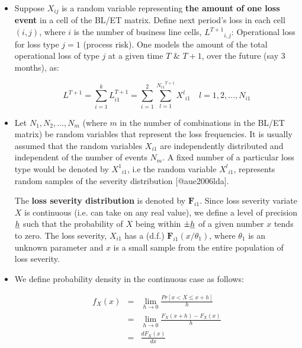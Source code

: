 \documentclass{DissertateUSU}
\begin{document}
\begin{itemize}
\item Suppose $X_{ij}$ is a random variable representing \textbf{the amount of one loss event} in a cell of the BL/ET matrix. Define next period's loss in each cell $(i,j)$, where $i$ is the number of business line cells, \begin{math} {{L}^{T+1}}_{i,j}\end{math}: Operational loss for loss type $j=1$ (process risk). One models the amount of the total operational loss of type $j$ at a given time $T$ \& $T + 1$, over the future (say 3 months), as:

\singlespacing
\begin{equation}\label{eqn5}
{L}^{T+1}=\sum_{i=1}^{k}{L}^{T+1}_{i1}=\sum_{i=1}^{2}\sum_{l=1}^{{{N}_{i1}}^{T+1}}{{X}^{l}}_{i1} \quad l=1,2,\ldots, N_{i1} 
\end{equation}
\doublespacing

\item Let $ N_1, N_2,...,N_m $ (where $m$ in the number of combinations in the BL/ET matrix) be random variables that represent the loss frequencies. It is usually assumed that the random variables $X_{i1}$ are independently distributed and independent of the number of events $N_{m}$. A fixed number of a particular loss type would be denoted by ${{X}^{1}}_{i1}$, i.e the random variable \begin{math}{{X}^{l}}_{i1}\end{math}, represents random samples of the severity distribution [@aue2006lda].\medskip

The \textbf{loss severity distribution} is denoted by \begin{math}\mathbf{F}_{i1}\end{math}. Since loss severity variate $X$ is continuous (i.e. can take on any real value), we define a level of precision $\emph{h}$ such that the probability of $X$ being within $\pm\emph{h}$ of a given number $x$ tends to zero. The loss severity, $X_{i1}$ has a (d.f.) \begin{math}\mathbf{F}_{i1}(x/\theta_1) \end{math}, where $\theta_1$ is an unknown parameter and $x$ is a small sample from the entire population of loss severity.

\item We define probability density in the continuous case as follows:

\singlespacing
\begin{eqnarray}
f_{X}(x) &=& \lim_{h\rightarrow 0}\frac{Pr[x < X \leq x + h]}{h}\nonumber\\
&=& \lim_{h\rightarrow 0}\frac{F_{X}(x + h) - F_{X}(x)}{h}\nonumber\\
&=&\frac{dF_{X}(x)}{dx} \label{eqn6a}
\end{eqnarray}
\doublespacing


\end{itemize}
\end{document}
